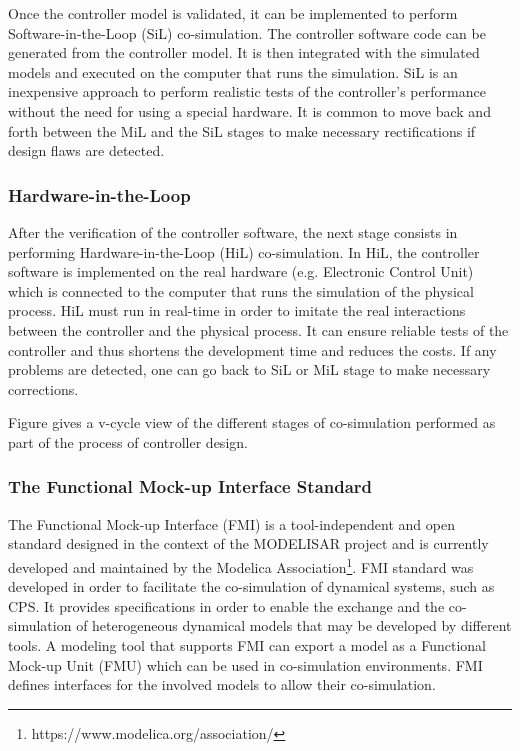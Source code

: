 Once the controller model is validated, it can be implemented to perform Software-in-the-Loop (SiL) co-simulation. The controller software code can be generated from the controller model. It is then integrated with the simulated models and executed on the computer that runs the simulation. SiL is an inexpensive approach to perform realistic tests of the controller’s performance without the need for using a special hardware. It is common to move back and forth between the MiL and the SiL stages to make necessary rectifications if design flaws are detected.

\subsubsection{Hardware-in-the-Loop}

After the verification of the controller software, the next stage consists in performing Hardware-in-the-Loop (HiL) co-simulation. In HiL, the controller software is implemented on the real hardware (e.g. Electronic Control Unit) which is connected to the computer that runs the simulation of the physical process. HiL must run in real-time in order to imitate the real interactions between the controller and the physical process. It can ensure reliable tests of the controller and thus shortens the development time and reduces the costs. If any problems are detected, one can go back to SiL or MiL stage to make necessary corrections.

Figure gives a v-cycle view of the different stages of co-simulation performed as part of the process of controller design.


\subsubsection{The Functional Mock-up Interface Standard}

The Functional Mock-up Interface (FMI) is a tool-independent and open standard designed in the context of the MODELISAR project and is currently developed and maintained by the Modelica Association\footnote{https://www.modelica.org/association/}. FMI standard was developed in order to facilitate the co-simulation of dynamical systems, such as CPS. It provides specifications in order to enable the exchange and the co-simulation of heterogeneous dynamical models that may be developed by different tools. A modeling tool that supports FMI can export a model as a Functional Mock-up Unit (FMU) which can be used in co-simulation environments. FMI defines interfaces for the involved models to allow their co-simulation.

